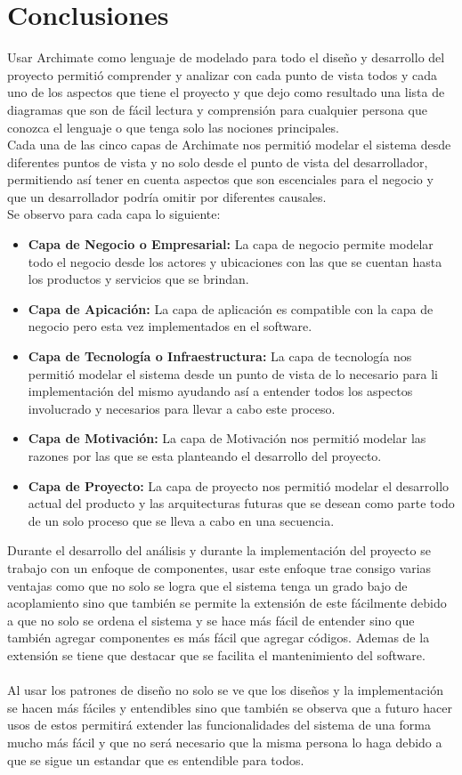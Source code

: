 \chapter{Conclusiones}


Usar Archimate como lenguaje de modelado para todo el diseño y desarrollo del proyecto permitió comprender y analizar con cada punto de vista todos y cada uno de los aspectos que tiene el proyecto y que dejo como resultado una lista de diagramas que son de fácil lectura y comprensión para cualquier persona que conozca el lenguaje o que tenga solo las nociones principales.\\
Cada una de las cinco capas de Archimate nos permitió modelar el sistema desde diferentes puntos de vista y no solo desde el punto de vista del desarrollador, permitiendo así tener en cuenta aspectos que son escenciales para el negocio y que un desarrollador podría omitir por diferentes causales. \\
Se observo para cada capa lo siguiente:
\begin{itemize}
	\item \textbf{Capa de Negocio o Empresarial: } La capa de negocio permite modelar todo el negocio desde los actores y ubicaciones con las que se cuentan hasta los productos y servicios que se brindan.
	\item \textbf{Capa de Apicación: }La capa de aplicación es compatible con la capa de negocio pero esta vez implementados en el software.
	\item \textbf{Capa de Tecnología o Infraestructura: }La capa de tecnología nos permitió modelar el sistema desde un punto de vista de lo necesario para li implementación del mismo ayudando así a entender todos los aspectos involucrado y necesarios para llevar a cabo este proceso.
	\item \textbf{Capa de Motivación: }La capa de Motivación nos permitió modelar las razones por las que se esta planteando el desarrollo del proyecto.
	\item \textbf{Capa de Proyecto: }La capa de proyecto nos permitió modelar el desarrollo actual del producto y las arquitecturas futuras que se desean como parte todo de un solo proceso que se lleva a cabo en una secuencia. 
\end{itemize}

Durante el desarrollo del análisis y durante la implementación del proyecto se trabajo con un enfoque de componentes, usar este enfoque trae consigo varias ventajas como que no solo se logra que el sistema tenga un grado  bajo de acoplamiento sino que también se permite la extensión de este fácilmente debido a que no solo se ordena el sistema y se hace más fácil de entender sino que también agregar componentes es más fácil que agregar códigos. Ademas de la extensión se tiene que destacar que se facilita el mantenimiento del software.\\
\\
Al usar los patrones de diseño no solo se ve que los diseños y la implementación se hacen más fáciles y entendibles sino que también se observa que a futuro hacer usos de estos permitirá extender las funcionalidades del sistema de una forma mucho más fácil y que no será necesario que la misma persona lo haga debido a que se sigue un estandar que es entendible para todos.